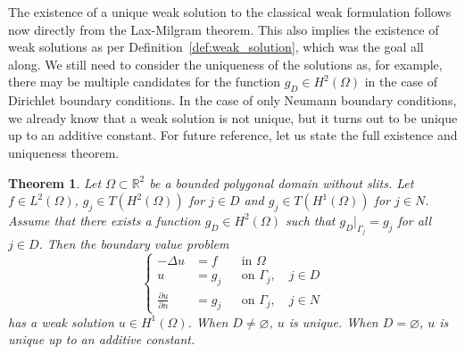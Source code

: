 \documentclass[english, 12pt, a4paper, sci, utf8, a-2b, online]{aaltothesis}
\theoremstyle{definition}
\theoremstyle{plain}
\newtheorem{theorem}{Theorem}[section]
\numberwithin{equation}{section}
\begin{document}
The existence of a unique weak solution to the classical weak formulation
follows now directly from the Lax-Milgram theorem.
This also implies the existence of weak solutions
as per Definition~\ref{def:weak_solution}, which was the goal all along.
We still need to consider the uniqueness of the solutions as, for example,
there may be multiple candidates for the function $g_D \in H^2(\Omega)$
in the case of Dirichlet boundary conditions.
In the case of only Neumann boundary conditions, we already know that
a weak solution is not unique, but it turns out to be unique up to
an additive constant.
For future reference, let us state the full existence and uniqueness theorem.
\begin{theorem}
    \label{thm:weak_poisson_is_solvable}
    Let $\Omega \subset \mathbb{R}^2$ be a bounded polygonal domain without slits.
    Let $f \in L^2(\Omega)$, $g_j \in T(H^2(\Omega))$ for $j \in D$
    and $g_j \in T(H^1(\Omega))$ for $j \in N$.
    Assume that there exists a function $g_D \in H^2(\Omega)$ such that
    $g_D|_{\Gamma_j} = g_j$ for all $j \in D$.
    Then the boundary value problem
    \begin{equation*}
        \left\{
            \begin{aligned}
                -\Delta u &= f && \text{in } \Omega \\
                u &= g_j && \text{on } \Gamma_j, \quad j \in D \\
                \frac{\partial u}{\partial n} &= g_j && \text{on } \Gamma_j,
                \quad j \in N
            \end{aligned}
        \right.
    \end{equation*}
    has a weak solution $u \in H^1(\Omega)$.
    When $D \neq \varnothing$, $u$ is unique.
    When $D = \varnothing$, $u$ is unique up to an additive constant.
\end{theorem}
\end{document}
